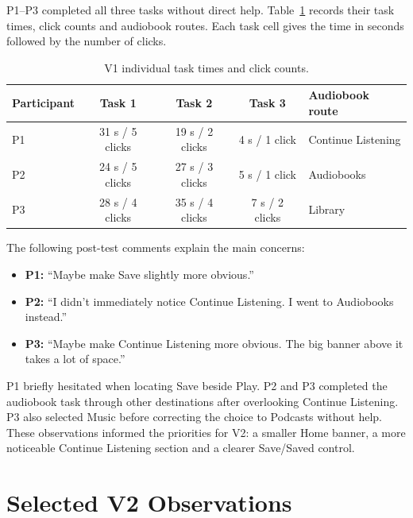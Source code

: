 P1--P3 completed all three tasks without direct help. Table~\ref{tab:appendix-v1} records their task times, click counts and audiobook routes. Each task cell gives the time in seconds followed by the number of clicks.

\begin{table}[!htbp]
  \centering
  \caption{V1 individual task times and click counts.}
  \label{tab:appendix-v1}
  \begingroup
  \small
  \renewcommand{\arraystretch}{1.3}
  \begin{tabular}{@{}lcccp{}@{}}
    \hline
    \textbf{Participant} & \textbf{Task 1} & \textbf{Task 2} & \textbf{Task 3} & \textbf{Audiobook route} \\
    \hline
    P1 & 31 s / 5 clicks & 19 s / 2 clicks & 4 s / 1 click & Continue Listening \\
    P2 & 24 s / 5 clicks & 27 s / 3 clicks & 5 s / 1 click & Audiobooks \\
    P3 & 28 s / 4 clicks & 35 s / 4 clicks & 7 s / 2 clicks & Library \\
    \hline
  \end{tabular}
  \endgroup
\end{table}

The following post-test comments explain the main concerns:

\begin{itemize}
  \setlength{\itemsep}{2pt}
  \setlength{\parsep}{0pt}
  \item \textbf{P1:} ``Maybe make Save slightly more obvious.''
  \item \textbf{P2:} ``I didn't immediately notice Continue Listening. I went to Audiobooks instead.''
  \item \textbf{P3:} ``Maybe make Continue Listening more obvious. The big banner above it takes a lot of space.''
\end{itemize}

P1 briefly hesitated when locating Save beside Play. P2 and P3 completed the audiobook task through other destinations after overlooking Continue Listening. P3 also selected Music before correcting the choice to Podcasts without help. These observations informed the priorities for V2: a smaller Home banner, a more noticeable Continue Listening section and a clearer Save/Saved control.

\section{Selected V2 Observations}


